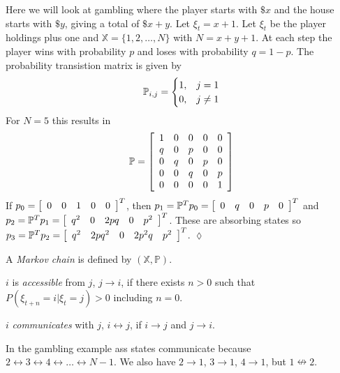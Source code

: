 \begin{example}
Here we will look at gambling where the player starts with $\$x$ and the house starts with $\$y$, giving a total of $\$x+y$. Let $\xi_t=x+1$. Let $\xi_t$ be the player holdings plus one and $\mathbb{X}=\{1,2,\ldots,N\}$ with $N=x+y+1$. At each step the player wins with probability $p$ and loses with probability $q=1-p$. The probability transistion matrix is given by
$$\mathbb{P}_{i,j} = \begin{cases} 1, & j=1 \\ 0, & j\neq1 \end{cases}$$
For $N=5$ this results in
\begin{align*}
\mathbb{P} = \left[\begin{array}{c c c c c}
1 & 0 & 0 & 0 & 0 \\
q & 0 & p & 0 & 0 \\
0 & q & 0 & p & 0 \\
0 & 0 & q & 0 & p \\
0 & 0 & 0 & 0 & 1
\end{array}\right]
\end{align*}
If $p_0 = \left[\begin{array}{c c c c c} 0 & 0 & 1 & 0 & 0 \end{array}\right]^T$, then $p_1=\mathbb{P}^Tp_0 = \left[\begin{array}{c c c c c} 0 & q & 0 & p & 0 \end{array}\right]^T$ and $p_2=\mathbb{P}^Tp_1=\left[\begin{array}{c c c c c} q^2 & 0 & 2pq & 0 & p^2 \end{array}\right]^T$. These are absorbing states so $p_3=\mathbb{P}^Tp_2=\left[\begin{array}{c c c c c} q^2 & 2pq^2 & 0 & 2p^2q & p^2 \end{array}\right]^T$.
$\lozenge$
\end{example}

\begin{definition}
A \textit{Markov chain} is defined by $(\mathbb{X},\mathbb{P})$.
\end{definition}

\begin{definition}
$i$ is \textit{accessible} from $j$, $j\rightarrow i$, if there exists $n>0$ such that $P(\xi_{t+n}=i|\xi_t=j)>0$ including $n=0$.
\end{definition}

\begin{definition}
$i$ \textit{communicates} with $j$, $i\leftrightarrow j$, if $i\rightarrow j$ and $j\rightarrow i$.
\end{definition}
In the gambling example ass states communicate because $2\leftrightarrow 3\leftrightarrow 4\leftrightarrow\ldots\leftrightarrow N-1$. We also have $2\rightarrow 1$, $3\rightarrow 1$, $4\rightarrow 1$, but $1\nleftrightarrow 2$.

